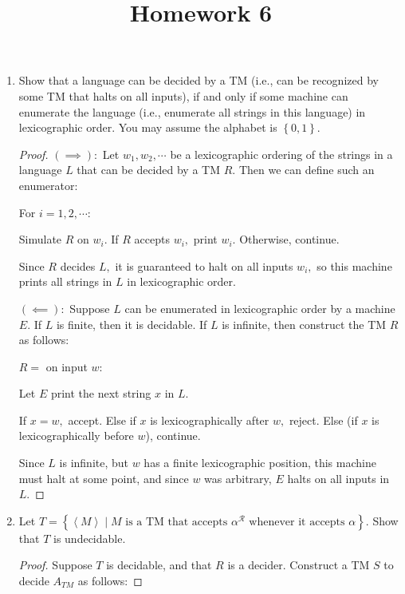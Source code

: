 \documentclass{article}
\begin{document}
\title{Homework 6}
\maketitle
\thispagestyle{fancy}

\begin{enumerate}
	\item Show that a language can be decided by a TM (i.e., can be recognized by some TM that halts on all inputs), if and only if some machine can enumerate the language (i.e., enumerate all strings in this language) in lexicographic order. You may assume the alphabet is $\left\{ 0, 1 \right\}.$
		\begin{proof}
			$(\implies):$ Let $w_1, w_2, \cdots$ be a lexicographic ordering of the strings in a language $L$ that can be decided by a TM $R.$ Then we can define such an enumerator:
			\begin{enumerate}[(1)]
				\ii For $i=1, 2, \cdots:$
				\begin{enumerate}[(a)]
					\ii Simulate $R$ on $w_i.$
					\ii If $R$ accepts $w_i,$ print $w_i.$ Otherwise, continue.
				\end{enumerate}
			\end{enumerate}

			Since $R$ decides $L,$ it is guaranteed to halt on all inputs $w_i,$ so this machine prints all strings in $L$ in lexicographic order.

			$(\impliedby):$ Suppose $L$ can be enumerated in lexicographic order by a machine $E.$ If $L$ is finite, then it is decidable. If $L$ is infinite, then construct the TM $R$ as follows:

			$R=$ on input $w:$
			\begin{enumerate}[(a)]
				\ii Let $E$ print the next string $x$ in $L.$
				\begin{enumerate}[(a)]
					\ii If $x=w,$ accept.
					\ii Else if $x$ is lexicographically after $w,$ reject.
					\ii Else (if $x$ is lexicographically before $w$), continue.
				\end{enumerate}
			\end{enumerate}

			Since $L$ is infinite, but $w$ has a finite lexicographic position, this machine must halt at some point, and since $w$ was arbitrary, $E$ halts on all inputs in $L.$
		\end{proof}

		\newpage
	\item Let $T=\left\{ \left< M\right>\mid M\text{ is a TM that accepts }\alpha^{\mathcal R}\text{ whenever it accepts }\alpha \right\}.$ Show that $T$ is undecidable.
		\begin{proof}
			Suppose $T$ is decidable, and that $R$ is a decider. Construct a TM $S$ to decide $A_{TM}$ as follows:


\end{proof}
\end{enumerate}
\end{document}
